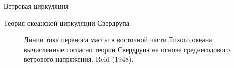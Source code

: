 \begin{chapter}{Ветровая циркуляция}
\begin{section}{Теория океанской циркуляции Свердрупа}
\begin{figure}[t!]
\caption{Линии тока переноса массы в восточной
части Тихого океана, вычисленные согласно теории Свердрупа на основе 
среднегодового ветрового напряжения. 
Reid (1948).}
\label{fig:sverdrupmap}
\end{figure}
%
%


\end{section}
\end{chapter}
